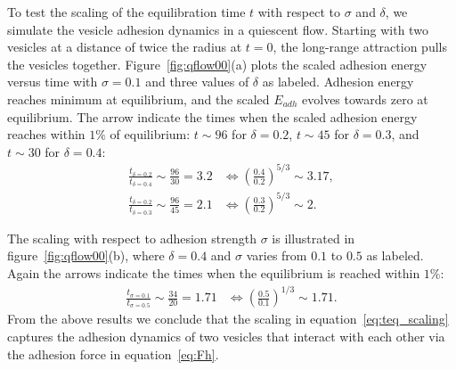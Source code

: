 \documentclass[aps,prl,twocolumn,showpacs,amsmath,amssymb]{revtex4-1}
\begin{document}
To test the scaling of the equilibration time $t$ with respect to $\sigma$ and $\delta$, we simulate the vesicle adhesion dynamics in a quiescent flow.
Starting with two vesicles at a distance of twice the radius at $t=0$, the long-range attraction pulls the vesicles together. Figure~\ref{fig:qflow00}(a) plots
the scaled adhesion energy versus time with $\sigma=0.1$ and three values of $\delta$ as labeled. 
Adhesion energy reaches minimum at equilibrium, and the scaled $E_{adh}$ evolves towards zero at equilibrium. 
The arrow indicate the times when the scaled adhesion energy
reaches within $1\%$ of equilibrium: $t\sim 96$ for $\delta=0.2$, $t\sim 45$ for $\delta = 0.3$, and $t\sim 30$ for $\delta=0.4$:
\begin{align}
\frac{t_{\delta=0.2}}{t_{\delta=0.4}} \sim \frac{96}{30}=3.2 &\Longleftrightarrow \left(\frac{0.4}{0.2}\right)^{5/3}\sim 3.17,\\
\frac{t_{\delta=0.2}}{t_{\delta=0.3}} \sim \frac{96}{45}=2.1 &\Longleftrightarrow \left(\frac{0.3}{0.2}\right)^{5/3}\sim 2.
\end{align}

The scaling with respect to adhesion strength $\sigma$ is illustrated in figure~\ref{fig:qflow00}(b), where $\delta = 0.4$ and $\sigma$ varies from $0.1$ to $0.5$ as labeled.
Again the arrows indicate the times when the equilibrium is reached within $1\%$:
\begin{align}
\frac{t_{\sigma=0.1}}{t_{\sigma=0.5}} \sim \frac{34}{20} = 1.71 &\Longleftrightarrow \left(\frac{0.5}{0.1}\right)^{1/3}\sim 1.71.
\end{align}
From the above results we conclude that the scaling in equation~\ref{eq:teq_scaling} captures the adhesion dynamics of two vesicles that interact with each other via the adhesion force in equation~\ref{eq:Fh}.
\end{document}
